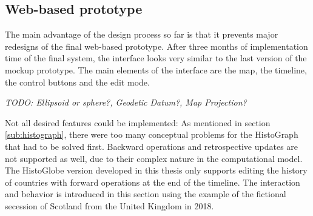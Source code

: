 
\subsection{Web-based prototype} %
\label{sub:web_based_prototype}

The main advantage of the design process so far is that it prevents major redesigns of the final web-based prototype. After three months of implementation time of the final system, the interface looks very similar to the last version of the mockup prototype. The main elements of the interface are the map, the timeline, the control buttons and the edit mode.

\emph{TODO: Ellipsoid or sphere?, Geodetic Datum?, Map Projection?}

Not all desired features could be implemented:
As mentioned in section \ref{sub:histograph}, there were too many conceptual problems for the HistoGraph that had to be solved first.
Backward operations and retrospective updates are not supported as well, due to their complex nature in the computational model. The HistoGlobe version developed in this thesis only supports editing the history of countries with forward operations at the end of the timeline. The interaction and behavior is introduced in this section using the example of the fictional secession of Scotland from the United Kingdom in 2018.

